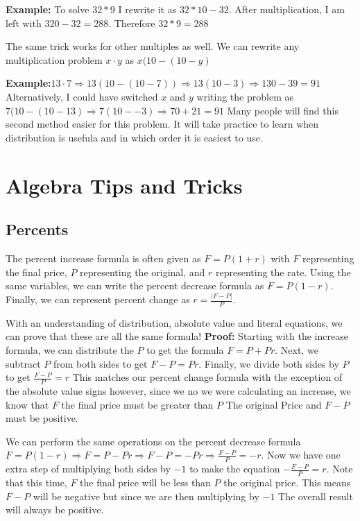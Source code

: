 \documentclass{article}
\begin{document}
	\bigskip
	
	\textbf{Example:} To solve $32*9$ I rewrite it as $32*10-32$. After multiplication, I am left with $320-32=288$. Therefore $32*9=288$

	\bigskip

	\indent The same trick works for other multiples as well. We can rewrite any multiplication problem $x\cdot y$ as $x(10-(10-y)$

	\bigskip

	\textbf{Example:}$13\cdot7 \Rightarrow 13(10-(10-7)) \Rightarrow 13(10-3) \Rightarrow 130-39=91$
	\bigskip
	Alternatively, I could have switched $x$ and $y$ writing the problem as $7(10-(10-13) \Rightarrow 7(10--3) \Rightarrow 70+21=91$ 
	\bigskip
	Many people will find this second method easier for this problem. It will take practice to learn when distribution is usefula and in which order it is easiest to use.

\bigskip
\bigskip

\section{Algebra Tips and Tricks}
\subsection{Percents}

The percent increase formula is often given as $F=P(1+r)$ with $F$ representing the final price, $P$ representing the original, and $r$ representing the rate. Using the same variables, we can write the percent decrease formula as $F=P(1-r)$. Finally, we can represent percent change as $r=\frac{\lvert F-P\rvert}{P}$.

\bigskip

With an understanding of distribution, absolute value and literal equations, we can prove that these are all the same formula!
\bigskip
\textbf{Proof: }Starting with the increase formula, we can distribute the $P$ to get the formula $F=P+Pr$. Next, we subtract $P$ from both sides to get $F-P=Pr$. Finally, we divide both sides by $P$ to get $\frac{F-P}{P}=r$ This matches our percent change formula with the exception of the absolute value signs however, since we no we were calculating an increase, we know that $F$ the final price must be greater than $P$ The original Price and $F-P$ must be positive.

\bigskip

We can perform the same operations on the percent decrease formula $F=P(1-r) \Rightarrow F=P-Pr \Rightarrow F-P=-Pr \Rightarrow \frac{F-P}{P}=-r$. Now we have one extra step of multiplying both sides by $-1$ to make the equation $-\frac{F-P}{P}=r$. Note that this time, $F$ the final price will be less than $P$ the original price. This means $F-P$ will be negative but since we are then multiplying by $-1$ The overall result will always be positive.
\end{document}

